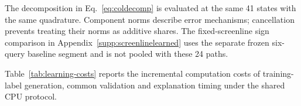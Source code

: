 The decomposition in Eq.~\eqref{eq:coldecomp} is evaluated at the same 41 states
with the same quadrature. Component norms describe error mechanisms; cancellation
prevents treating their norms as additive shares. The fixed-screenline sign
comparison in Appendix~\ref{supp:screenlinelearned} uses the separate frozen
six-query baseline segment and is not pooled with these 24 paths.

Table~\ref{tab:learning-costs} reports the incremental computation
costs of training-label generation, common validation and explanation
timing under the shared CPU protocol.



